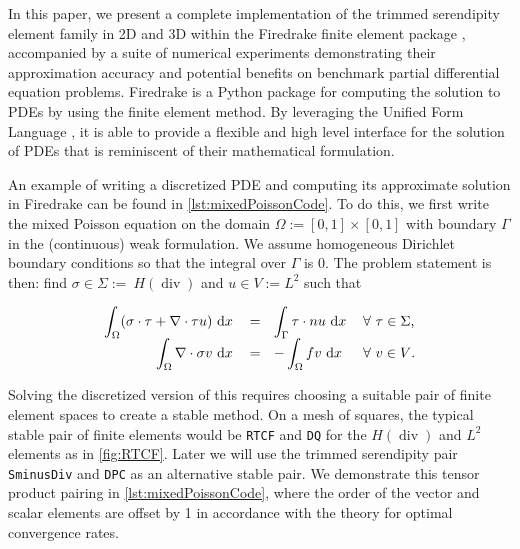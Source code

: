 \documentclass[format=acmsmall,screen,timestamp=false,a4paper]{acmart}
\DeclareMathOperator{\Div}{div}
\newcommand\akg[1]{\textbf{\textcolor[rgb]{.5,0,1}{[Andrew: #1]}}}
\newcommand\lm[1]{\textbf{\textcolor[rgb]{1,0,0.5}{[Lawrence: #1]}}}
\newcommand{\hdiv}{\ensuremath{{H}(\Div)}\xspace}
\begin{document}
In this paper, we present a complete implementation of the trimmed serendipity element family in 2D and 3D within the Firedrake finite element package \cite{rathgeber2016firedrake}, accompanied by a suite of numerical experiments demonstrating their approximation accuracy and potential benefits on benchmark partial differential equation problems.
Firedrake is a Python package for computing the solution to PDEs by using the finite element method.  By leveraging the Unified Form Language \cite{Logg:2012,alnaes2014unified}, it is able to provide a flexible and high level interface for the solution of PDEs that is reminiscent of their mathematical formulation.


An example of writing a discretized PDE and computing its approximate solution in Firedrake can be found in \cref{lst:mixedPoissonCode}. To do this, we first write the mixed Poisson equation on the domain $\Omega := [0, 1] \times [0,1]$ with boundary $\Gamma$ in the (continuous) weak formulation.  We assume homogeneous Dirichlet boundary conditions so that the integral over $\Gamma$ is $0$.  The problem statement is then:
find $\sigma \in \Sigma :=~$\hdiv and $u \in V := L^2$ such that%

\begin{equation}\label{eq:MixedPoisson}
\begin{tabular}{rllll}

$\displaystyle\int_\Omega (\sigma \cdot \tau + \nabla\cdot\tau u) \text{ d}x$ & $=~~\displaystyle \int_\Gamma \tau \cdot n u \text{ d}x$ & $\forall~ \tau\in\Sigma$, \\
$\displaystyle\int_\Omega \nabla \cdot \sigma v \text{ d}x$ & $= ~~\displaystyle -\int_\Omega fv \text{ d}x$ & $\forall~ v\in V$.
\end{tabular}
\end{equation}

Solving the discretized version of this requires choosing a suitable pair of finite element spaces to create a stable method.  On a mesh of squares, the typical stable pair of finite elements would be \texttt{RTCF} and \texttt{DQ} for the \hdiv and $L^2$ elements as in \cref{fig:RTCF}.  Later we will use the trimmed serendipity pair \texttt{SminusDiv} and \texttt{DPC} as an alternative stable pair.  We demonstrate this tensor product pairing in \cref{lst:mixedPoissonCode}, where the order of the vector and scalar elements are offset by 1 in accordance with the theory for optimal convergence rates.
\end{document}
